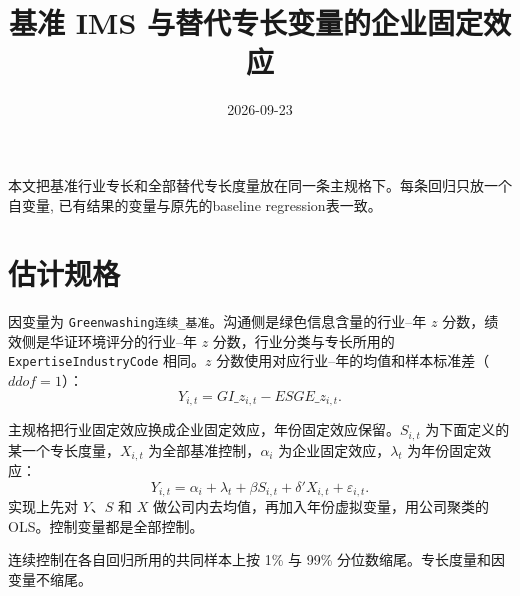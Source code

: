 \documentclass[11pt]{article}
\title{基准 IMS 与替代专长变量的企业固定效应}
\author{}
\date{2026-09-23}
\begin{document}
\maketitle

本文把基准行业专长和全部替代专长度量放在同一条主规格下。每条回归只放一个自变量, 已有结果的变量与原先的baseline regression表一致。

\section{估计规格}
\label{sec:spec}

因变量为 \texttt{Greenwashing连续\_基准}。沟通侧是绿色信息含量的行业--年 \(z\) 分数，绩效侧是华证环境评分的行业--年 \(z\) 分数，行业分类与专长所用的 \texttt{ExpertiseIndustryCode} 相同。\(z\) 分数使用对应行业--年的均值和样本标准差（\(ddof=1\)）：
\[
Y_{i,t}=GI\_z_{i,t}-ESGE\_z_{i,t}.
\]

主规格把行业固定效应换成企业固定效应，年份固定效应保留。\(S_{i,t}\) 为下面定义的某一个专长度量，\(X_{i,t}\) 为全部基准控制，\(\alpha_i\) 为企业固定效应，\(\lambda_t\) 为年份固定效应：
\begin{equation}
Y_{i,t}=\alpha_i+\lambda_t+\beta S_{i,t}+\delta'X_{i,t}+\varepsilon_{i,t}.
\label{eq:firmfe}
\end{equation}
实现上先对 \(Y\)、\(S\) 和 \(X\) 做公司内去均值，再加入年份虚拟变量，用公司聚类的 OLS。控制变量都是全部控制。

连续控制在各自回归所用的共同样本上按 1\% 与 99\% 分位数缩尾。专长度量和因变量不缩尾。
\end{document}
